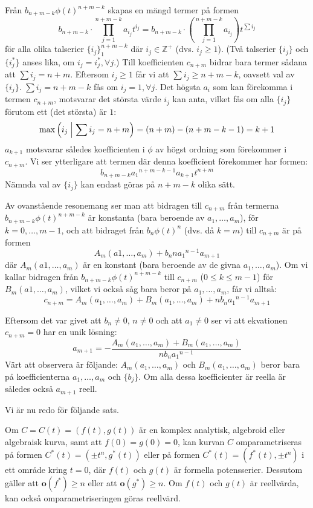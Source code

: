 Från $b_{n+m-k} \phi(t)^{n+m-k}$ skapas en mängd termer på formen
\[b_{n+m-k} \cdot \prod_{j=1}^{n+m-k} a_{i_j} t^{i_j} = b_{n+m-k} \cdot \left( \prod_{j=1}^{n+m-k} a_{i_j} \right) t^{\sum i_j} \]
för alla olika talserier $\{i_j\}_1^{n+m-k}$ där $i_j \in \mathbb{Z}^+$ (dvs. $i_j \geq 1$). (Två talserier $\{i_j\}$ och $\{i^*_j\}$ anses lika, om $i_j=i^*_j, \forall j$.) Till koefficienten $c_{n+m}$ bidrar bara termer sådana att $\sum i_j = n+m$. Eftersom $i_j \geq 1$ får vi att $\sum i_j \geq n+m-k$, oavsett val av $\{i_j\}$. $\sum i_j = n+m-k$ fås om $i_j = 1, \forall j$. Det högsta $a_i$ som kan förekomma i termen $c_{n+m}$, motsvarar det största värde $i_j$ kan anta, vilket fås om alla $\{i_j\}$ förutom ett (det största) är $1$:
\[\max \left( i_j \Bigm| \sum i_j = n+m \right) = (n+m)-(n+m-k-1)=k+1\] 
$a_{k+1}$ motsvarar således koefficienten i $\phi$ av högst ordning som förekommer i $c_{n+m}$. Vi ser ytterligare att termen där denna koefficient förekommer har formen:
\[b_{n+m-k} {a_1}^{n+m-k-1} a_{k+1} t^{n+m}\]
Nämnda val av $\{i_j\}$ kan endast göras på $n + m - k$ olika sätt.

Av ovanstående resonemang ser man att bidragen till $c_{n+m}$ från termerna $b_{n+m-k} \phi(t)^{n+m-k}$ är konstanta (bara beroende av $a_1, \ldots, a_m$), för $k = 0, \ldots , m - 1$, och att bidraget från $b_n \phi(t)^n$ (dvs. då $k = m$) till $c_{n+m}$ är på formen
\[A_m(a1, \ldots, a_m) + b_n n {a_1}^{n-1} a_{m+1}\]
där $A_m(a1, \ldots, a_m)$ är en konstant (bara beroende av de givna $a_1, \ldots, a_m$). Om vi kallar bidragen från $b_{n+m-k} \phi(t)^{n+m-k}$ till $c_{n+m}$ ($0 \leq k \leq m-1$) för $B_m(a1, \ldots, a_m)$, vilket vi också såg bara beror på $a_1, \ldots, a_m$, får vi alltså:
\[c_{n+m} = A_m(a_1, \ldots, a_m) + B_m(a_1, \ldots, a_m) + n b_n {a_1}^{n-1} a_{m+1}\]

Eftersom det var givet att $b_n \neq 0$, $n \neq 0$ och att $a_1 \neq 0$ ser vi att ekvationen $c_{n+m} = 0$ har en unik lösning:
\[a_{m+1} = -\frac{A_m(a_1, \ldots, a_m) + B_m(a_1, \ldots, a_m)}{n b_n {a_1}^{n-1}}\]
Värt att observera är följande: $A_m(a_1, \ldots, a_m)$ och $B_m(a_1, \ldots, a_m)$ beror bara på koefficienterna $a_1, \ldots, a_m$ och $\{b_j\}$. Om alla dessa koefficienter är reella är således också $a_{m+1}$ reell.

Vi är nu redo för följande sats.

\begin{Theorem}
\label{ReparametrizeTheorem}
Om $C = C(t) = \left(f(t), g(t)\right)$ är en komplex analytisk, algebroid eller algebraisk kurva, samt att $f(0) = g(0) = 0$, kan kurvan $C$ omparametriseras på formen $C^*(t) = \left(\pm t^n, g^*(t)\right)$ eller på formen $C^*(t) = \left(f^*(t), \pm t^n \right)$ i ett område kring $t = 0$, där $f(t)$ och $g(t)$ är formella potensserier. Dessutom gäller att $\mathbf{o}\left(f^*\right) \geq n$ eller att $\mathbf{o}\left(g^*\right) \geq n$. Om $f(t)$ och $g(t)$ är reellvärda, kan också omparametriseringen göras reellvärd.
\end{Theorem}

